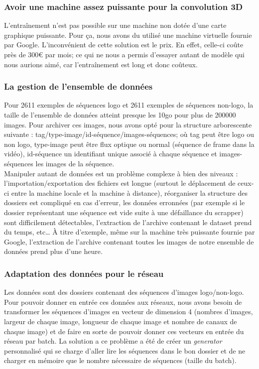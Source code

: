 \documentclass[11pt]{article}
\begin{document}
\subsubsection{Avoir une machine assez puissante pour la convolution 3D}
\label{sec:org87d061a}
L'entraînement n'est pas possible sur une machine non dotée d'une carte graphique puissante. Pour ça, nous avons du utilisé une machine virtuelle fournie par Google. L'inconvénient de cette solution est le prix. En effet, celle-ci coûte près de 300€ par mois; ce qui ne nous a permis d'essayer autant de modèle qui nous aurions aimé, car l'entraînement est long et donc coûteux.\\
\subsubsection{La gestion de l'ensemble de données}
\label{sec:org4e19863}
Pour 2611 exemples de séquences logo et 2611 exemples de séquences non-logo, la taille de l'ensemble de données atteint presque les 10go pour plus de 200000 images. Pour archiver ces images, nous avons opté pour la structure arborescente suivante : tag/type-image/id-séquence/images-séquences; où tag peut être logo ou non logo, type-image peut être flux optique ou normal (séquence de frame dans la vidéo), id-séquence un identifiant unique associé à chaque séquence et images-séquences les images de la séquence.\\
Manipuler autant de données est un problème complexe à bien des niveaux : l'importation/exportation des fichiers est longue (surtout le déplacement de ceux-ci entre la machine locale et la machine à distance), réorganiser la structure des dossiers est compliqué en cas d'erreur, les données erronnées (par exemple si le dossier représentant une séquence est vide suite à une défaillance du scrapper) sont difficilement détectables, l'extraction de l'archive contenant le dataset prend du temps, etc\ldots{} À titre d'exemple, même sur la machine très puissante fournie par Google, l'extraction de l'archive contenant toutes les images de notre ensemble de données prend plus d'une heure.\\
\subsubsection{Adaptation des données pour le réseau}
\label{sec:org1520b98}
Les données sont des dossiers contenant des séquences d'images logo/non-logo.\\
Pour pouvoir donner en entrée ces données aux réseaux, nous avons besoin de transformer les séquences d'images en vecteur de dimension 4 (nombres d'images, largeur de chaque image, longueur de chaque image et nombre de canaux de chaque image) et de faire en sorte de pouvoir donner ces vecteurs en entrée du réseau par batch. La solution a ce problème a été de créer un \emph{generator} personnalisé qui se charge d'aller lire les séquences dans le bon dossier et de ne charger en mémoire que le nombre nécessaire de séquences (taille du batch).\\
\end{document}
